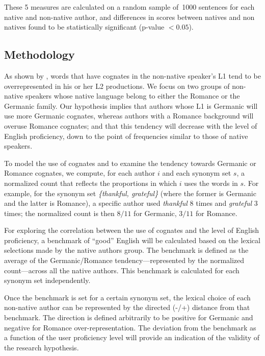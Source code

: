 \documentclass[11pt]{article}
\newcommand{\textnl}{\textsl}
\begin{document}
These 5 measures are calculated on a random sample of~1000 sentences for each native and non-native author, and differences in scores between natives and non natives found to be statistically significant (p-value $<0.05$).


\subsection{Methodology}

As shown by \citet{TACL1403}, words that have  cognates in the non-native speaker's L1 tend to be overrepresented in his or her L2 productions. We focus on two groups of non-native speakers whose native language belong to either the Romance or the Germanic family. Our hypothesis implies that authors whose L1 is Germanic will use more Germanic cognates, whereas authors with a Romance background will overuse Romance cognates; and that this tendency will decrease with the level of English proficiency, down to the point of frequencies similar to those of native speakers.

To model the use of cognates and to examine the tendency towards Germanic or Romance cognates, we compute, for each author $i$ and each synonym set $s$, a normalized count that reflects the proportions in which $i$ uses the words in $s$. 
For example, for the synonym set \textnl{\{thankful, grateful\}} (where the former is Germanic and the latter is Romance), a specific author used \textnl{thankful} 8 times and \textnl{grateful} 3 times; the normalized count is then $8/11$ for Germanic, $3/11$ for Romance. 

For exploring the correlation between the use of cognates and the level of English proficiency, a benchmark of ``good'' English will be calculated based on the lexical selections made by the native authors group. The benchmark is defined as the average of the Germanic/Romance tendency---represented by the normalized count---across all the native authors. This benchmark is calculated for each synonym set independently. 

Once the benchmark is set for a certain synonym set, the lexical choice of each non-native author can be represented by the directed (-/+) distance from that benchmark. The direction is defined arbitrarily to be positive for Germanic and negative for Romance over-representation.  The deviation from the benchmark as a function of the user proficiency level will provide an indication of the validity of the research hypothesis. 
\end{document}
